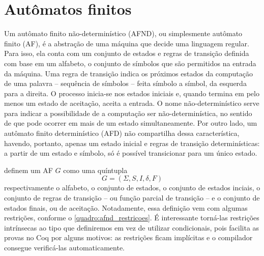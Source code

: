 \chapter{Autômatos finitos}

Um autômato finito não-determinístico (AFND), ou simplesmente autômato finito (AF), é a abstração de uma máquina que decide uma linguagem regular. Para isso, ela conta com um conjunto de estados e regras de transição definida com base em um alfabeto, o conjunto de símbolos que são permitidos na entrada da máquina. Uma regra de transição indica os próximos estados da computação de uma palavra -- sequência de símbolos -- feita símbolo a símbol, da esquerda para a direita. O processo inicia-se nos estados iniciais e, quando termina em pelo menos um estado de aceitação, aceita a entrada. O nome não-determinístico serve para indicar a possibilidade de a computação ser não-determinística, no sentido de que pode ocorrer em mais de um estado simultaneamente. Por outro lado, um autômato finito determinístico (AFD) não compartilha dessa característica, havendo, portanto, apenas um estado inicial e regras de transição determinísticas: a partir de um estado e símbolo, só é possível transicionar para um único estado.

 definem um AF $G$ como uma quíntupla \begin{equation}
  \label{eq:afnd_def_1}
  G = (\Sigma, S, I, \delta, F)
\end{equation} respectivamente o alfabeto, o conjunto de estados, o conjunto de estados inciais, o conjunto de regras de transição -- ou função parcial de transição -- e o conjunto de estados finais, ou de aceitação. Notadamente, essa definição vem com algumas restrições, conforme o \autoref{quadro:afnd_restricoes}. É interessante torná-las restrições intrínsecas ao tipo que definiremos em vez de utilizar condicionais, pois facilita as provas no Coq por alguns motivos: as restrições ficam implícitas e o compilador consegue verificá-las automaticamente.


